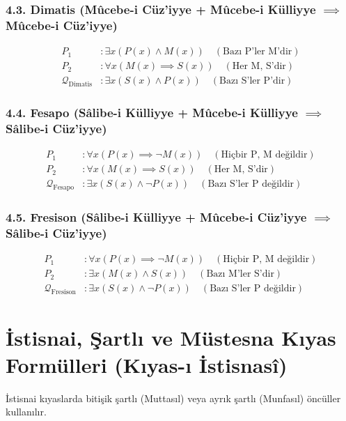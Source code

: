 \documentclass[11pt, a4paper]{article}
\begin{document}
\subsubsection{4.3. Dimatis (Mûcebe-i Cüz'iyye + Mûcebe-i Külliyye $\implies$ Mûcebe-i Cüz'iyye)}
\begin{align}
P_1 &: \exists x (P(x) \land M(x)) \quad (\text{Bazı P'ler M'dir}) \\
P_2 &: \forall x (M(x) \implies S(x)) \quad (\text{Her M, S'dir}) \\
\mathcal{Q}_{\text{Dimatis}} &: \exists x (S(x) \land P(x)) \quad (\text{Bazı S'ler P'dir})
\end{align}

\subsubsection{4.4. Fesapo (Sâlibe-i Külliyye + Mûcebe-i Külliyye $\implies$ Sâlibe-i Cüz'iyye)}
\begin{align}
P_1 &: \forall x (P(x) \implies \neg M(x)) \quad (\text{Hiçbir P, M değildir}) \\
P_2 &: \forall x (M(x) \implies S(x)) \quad (\text{Her M, S'dir}) \\
\mathcal{Q}_{\text{Fesapo}} &: \exists x (S(x) \land \neg P(x)) \quad (\text{Bazı S'ler P değildir})
\end{align}

\subsubsection{4.5. Fresison (Sâlibe-i Külliyye + Mûcebe-i Cüz'iyye $\implies$ Sâlibe-i Cüz'iyye)}
\begin{align}
P_1 &: \forall x (P(x) \implies \neg M(x)) \quad (\text{Hiçbir P, M değildir}) \\
P_2 &: \exists x (M(x) \land S(x)) \quad (\text{Bazı M'ler S'dir}) \\
\mathcal{Q}_{\text{Fresison}} &: \exists x (S(x) \land \neg P(x)) \quad (\text{Bazı S'ler P değildir})
\end{align}

\section{İstisnai, Şartlı ve Müstesna Kıyas Formülleri (Kıyas-ı İstisnasî)}

İstisnai kıyaslarda bitişik şartlı (Muttasıl) veya ayrık şartlı (Munfasıl) öncüller kullanılır.
\end{document}
